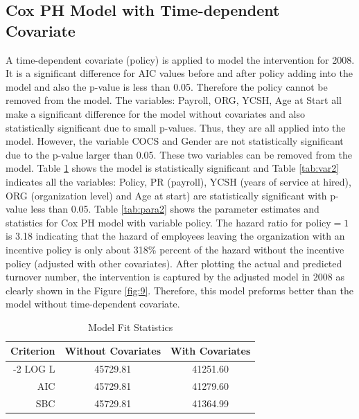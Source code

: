 \subsection{Cox PH Model with Time-dependent Covariate}
A time-dependent covariate (policy) is applied to model the intervention for 2008. It is a significant difference for AIC values before and after policy adding into the model and also the p-value is less than 0.05. Therefore the policy cannot be removed from the model. The variables: Payroll, ORG, YCSH, Age at Start all make a significant difference for the model without covariates and also statistically significant due to small p-values. Thus, they are all applied into the model. However, the variable COCS and Gender are not statistically significant due to the p-value larger than 0.05. These two variables can be removed from the model. Table \ref{tab:fit2} shows the model is statistically significant and Table \ref{tab:var2} indicates all the variables:  Policy, PR (payroll), YCSH (years of service at hired), ORG (organization level) and Age at start) are statistically significant with p-value less than 0.05. Table \ref{tab:para2} shows the parameter estimates and statistics for Cox PH model with variable policy. The hazard ratio for policy$=1$ is 3.18 indicating that the hazard of employees leaving the organization with an incentive policy is only about 318\% percent of the hazard without the incentive policy (adjusted with other covariates). After plotting the actual and predicted turnover number, the intervention is captured by the adjusted model in 2008 as clearly shown in the Figure \ref{fig:9}. Therefore, this model preforms better than the model without time-dependent covariate.  

\begin{table}[htbp]
	\small
	\centering
	\caption{Model Fit Statistics}
	\begin{tabular}{rrr}
		\hline
		\multicolumn{1}{c}{Criterion} & \multicolumn{1}{c}{Without Covariates} & \multicolumn{1}{c}{With Covariates} \\
		\hline
		-2 LOG L & \multicolumn{1}{c}{45729.81} & \multicolumn{1}{c}{41251.60} \\
		AIC   & \multicolumn{1}{c}{45729.81} & \multicolumn{1}{c}{41279.60} \\
		SBC   & \multicolumn{1}{c}{45729.81} & \multicolumn{1}{c}{41364.99} \\
		\hline
	\end{tabular}%
	\label{tab:fit2}%
\end{table}%

